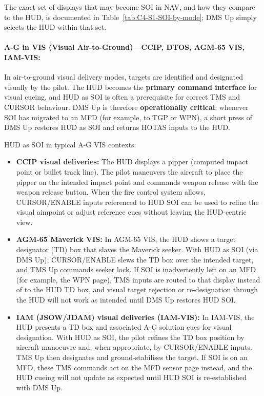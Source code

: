 \documentclass[11pt, a4paper, twoside]{report}
\begin{document}
The exact set of displays that may become SOI in NAV, and how they compare to the HUD, is documented in Table~\ref{tab:C4-S1-SOI-by-mode}; DMS Up simply selects the HUD within that set.

\paragraph*{A-G in VIS (Visual Air-to-Ground)---CCIP, DTOS, AGM-65 VIS, IAM-VIS:}
In air-to-ground visual delivery modes, targets are identified and designated visually by the pilot. The HUD becomes the \textbf{primary command interface} for visual cueing, and HUD as SOI is often a prerequisite for correct TMS and CURSOR behaviour. DMS Up is therefore \textbf{operationally critical}: whenever SOI has migrated to an MFD (for example, to TGP or WPN), a short press of DMS Up restores HUD as SOI and returns HOTAS inputs to the HUD.

HUD as SOI in typical A-G VIS contexts:

\begin{itemize}
  \item \textbf{CCIP visual deliveries:} The HUD displays a pipper (computed impact point or bullet track line). The pilot maneuvers the aircraft to place the pipper on the intended impact point and commands weapon release with the weapon release button. When the fire control system allows, CURSOR/ENABLE inputs referenced to HUD SOI can be used to refine the visual aimpoint or adjust reference cues without leaving the HUD-centric view.
  \item \textbf{AGM-65 Maverick VIS:} In AGM-65 VIS, the HUD shows a target designator (TD) box that slaves the Maverick seeker. With HUD as SOI (via DMS Up), CURSOR/ENABLE slews the TD box over the intended target, and TMS Up commands seeker lock. If SOI is inadvertently left on an MFD (for example, the WPN page), TMS inputs are routed to that display instead of to the HUD TD box, and visual target rejection or re-designation through the HUD will not work as intended until DMS Up restores HUD SOI.
  \item \textbf{IAM (JSOW/JDAM) visual deliveries (IAM-VIS):} In IAM-VIS, the HUD presents a TD box and associated A-G solution cues for visual designation. With HUD as SOI, the pilot refines the TD box position by aircraft manoeuvre and, when appropriate, by CURSOR/ENABLE inputs. TMS Up then designates and ground-stabilises the target. If SOI is on an MFD, these TMS commands act on the MFD sensor page instead, and the HUD cueing will not update as expected until HUD SOI is re-established with DMS Up.
\end{itemize}
\end{document}
